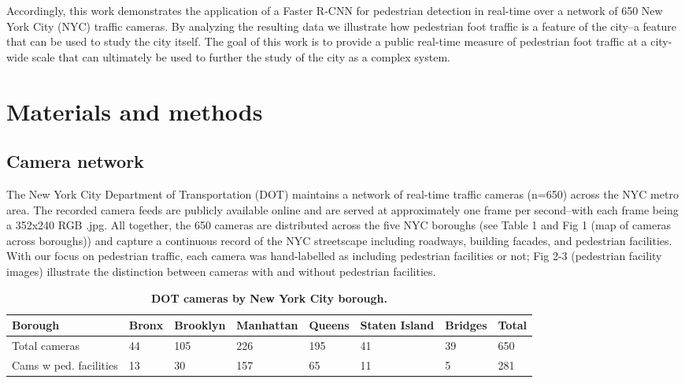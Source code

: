 \documentclass[10pt,letterpaper]{article}
\begin{document}
Accordingly, this work demonstrates the application of a Faster R-CNN for pedestrian detection in real-time over a network of 650 New York City (NYC) traffic cameras. By analyzing the resulting data we illustrate how pedestrian foot traffic is a feature of the city--a feature that can be used to study the city itself. The goal of this work is to provide a public real-time measure of pedestrian foot traffic at a city-wide scale that can ultimately be used to further the study of the city as a complex system.

\section*{Materials and methods}
\subsection*{Camera network}
The New York City Department of Transportation (DOT) maintains a network of real-time traffic cameras (n=650) across the NYC metro area. The recorded camera feeds are publicly available online and are served at approximately one frame per second--with each frame being a 352x240 RGB .jpg. All together, the 650 cameras are distributed across the five NYC boroughs (see Table 1 and Fig 1 (map of cameras across boroughs)) and capture a continuous record of the NYC streetscape including roadways, building facades, and pedestrian facilities. With our focus on pedestrian traffic, each camera was hand-labelled as including pedestrian facilities or not; Fig 2-3 (pedestrian facility images) illustrate the distinction between cameras with and without pedestrian facilities.

\begin{table}[!ht]
\begin{adjustwidth}{-2.25in}{0in} %
\centering
\caption{
{\bf DOT cameras by New York City borough.}}
\begin{tabular}{|l|l|l|l|l|l|l|l|}
\hline
\textbf{Borough}                   & \textbf{Bronx} & \textbf{Brooklyn} & \textbf{Manhattan} & \textbf{Queens} & \textbf{Staten Island} & \textbf{Bridges} & \textbf{Total}\\ \hline
Total cameras                      & 44             & 105               & 226                & 195             & 41                     & 39               & 650           \\ \hline
Cams w ped. facilities             & 13             & 30                & 157                & 65              & 11                     & 5                & 281           \\ \hline
\end{tabular}
\label{table1}
\end{adjustwidth}
\end{table}
\end{document}
